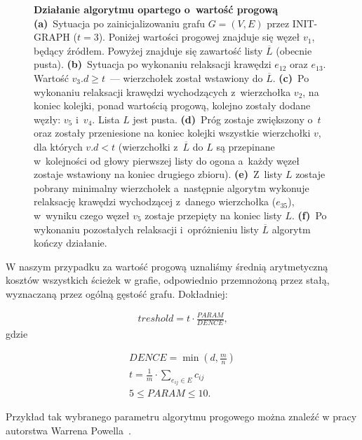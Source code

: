 \begin{figure}[!ht]
\begin{subfigure}[b]{\textwidth}
\begin{subfigure}[b]{0.32\textwidth}
			\caption{}
			\label{fig:exampleThreshold:f}
		\end{subfigure}
		\hfill\null
	\end{subfigure}
	\caption{
		\textbf{Działanie algorytmu opartego o~wartość progową}
		\textbf{(a)}~Sytuacja po zainicjalizowaniu grafu $G = \left( V, E \right)$ przez \textsf{INIT-GRAPH} ($t=3$).
		Poniżej wartości progowej znajduje się węzeł $v_{1}$, będący źródłem.
		Powyżej znajduje się zawartość listy $\overline{L}$ (obecnie pusta).
		\textbf{(b)}~Sytuacja po wykonaniu relaksacji krawędzi $e_{12}$ oraz $e_{13}$.
		Wartość $v_{3}.d \geqslant t$~--- wierzchołek został wstawiony do $\overline{L}$.
		\textbf{(c)}~Po wykonaniu relaksacji krawędzi wychodzących z~wierzchołka $v_{2}$, na koniec kolejki, ponad wartością progową, kolejno zostały dodane węzły: $v_{5}$ i~$v_{4}$.
		Lista $L$ jest pusta.
		\textbf{(d)}~Próg zostaje zwiększony o~$t$ oraz zostały przeniesione na koniec kolejki wszystkie wierzchołki $v$, dla których $v.d < t$ (wierzchołki z~$\overline{L}$ do $L$ są przepinane w~kolejności od głowy pierwszej listy do ogona a~każdy węzeł zostaje wstawiony na koniec drugiego zbioru).
		\textbf{(e)}~Z~listy $L$ zostaje pobrany minimalny wierzchołek a~następnie algorytm wykonuje relaksację krawędzi wychodzącej z~danego wierzchołka ($e_{35}$), w~wyniku czego węzeł $v_{5}$ zostaje przepięty na koniec listy $L$.
		\textbf{(f)}~Po wykonaniu pozostałych relaksacji i~opróżnieniu listy $\overline{L}$ algorytm kończy działanie.
	}
	\label{fig:exampleThreshold}
\end{figure}

W naszym przypadku za wartość progową uznaliśmy średnią arytmetyczną kosztów wszystkich ścieżek w grafie, odpowiednio przemnożoną przez stałą, wyznaczaną przez ogólną gęstość grafu.
Dokładniej:

\begin{eqnarray}
	treshold = t \cdot \frac{PARAM}{DENCE}\textrm{,}
\end{eqnarray}
gdzie

\begin{eqnarray}
	DENCE = \min \left( d, \frac{m}{n}\right) \\
	t = \frac{1}{m} \cdot \sum_{e_{ij} \in E} c_{ij} \\
	5 \leqslant PARAM \leqslant 10\textrm{.}
\end{eqnarray}

Przykład tak wybranego parametru algorytmu progowego można znaleźć w pracy autorstwa Warrena Powella~\cite[$2$]{Powell_ageneralized}.
